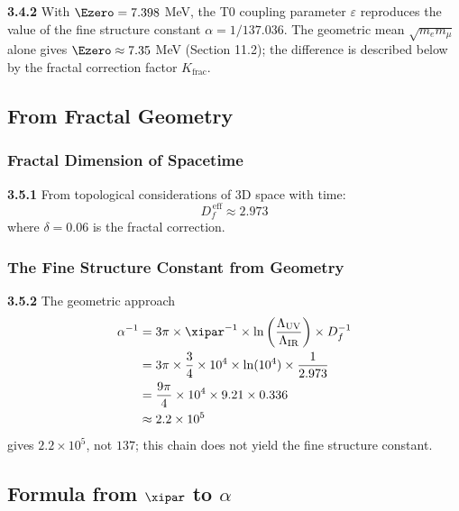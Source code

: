 	\begin{tcolorbox}[colback=blue!5!white,colframe=blue!75!black,title=Comparison with the Fine Structure Constant]
		\textbf{3.4.2} With $\Ezero = 7.398$ MeV, the T0 coupling parameter $\varepsilon$ reproduces the value of the fine structure constant $\alpha = 1/137.036$. The geometric mean $\sqrt{m_e m_\mu}$ alone gives $\Ezero \approx 7.35$ MeV (Section 11.2); the difference is described below by the fractal correction factor $K_{\text{frac}}$.
	\end{tcolorbox}
	
	\subsection{From Fractal Geometry}
	
	\subsubsection{Fractal Dimension of Spacetime}
	
	\noindent \textbf{3.5.1} From topological considerations of 3D space with time:
	\begin{equation}
		D_f^{\,\text{eff}} \approx 2.973
	\end{equation}
	where $\delta = 0.06$ is the fractal correction.
	
	\subsubsection{The Fine Structure Constant from Geometry}
	
	\noindent \textbf{3.5.2} The geometric approach
	\begin{align}
		\alpha^{-1} &= 3\pi \times \xipar^{-1} \times \ln\left(\frac{\Lambda_{\text{UV}}}{\Lambda_{\text{IR}}}\right) \times D_f^{-1} \\
		&= 3\pi \times \frac{3}{4} \times 10^{4} \times \ln(10^{4}) \times \frac{1}{2.973} \\
		&= \frac{9\pi}{4} \times 10^{4} \times 9.21 \times 0.336 \\
		&\approx 2.2 \times 10^{5}
	\end{align}
	gives $2.2\times10^5$, not $137$; this chain does not yield the fine structure constant.

	\subsection{Formula from $\xipar$ to $\alpha$}
	
